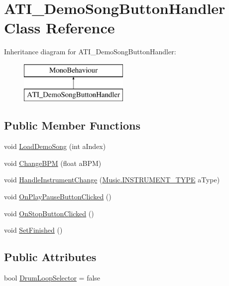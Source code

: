 \hypertarget{class_a_t_i___demo_song_button_handler}{}\section{A\+T\+I\+\_\+\+Demo\+Song\+Button\+Handler Class Reference}
\label{class_a_t_i___demo_song_button_handler}
Inheritance diagram for A\+T\+I\+\_\+\+Demo\+Song\+Button\+Handler\+:\begin{figure}[H]
\begin{center}
\leavevmode
\includegraphics[height=2.000000cm]{class_a_t_i___demo_song_button_handler}
\end{center}
\end{figure}
\subsection*{Public Member Functions}
\begin{DoxyCompactItemize}
\item 
void \hyperlink{class_a_t_i___demo_song_button_handler_a584b9dd672e492fe0df592061c7733de}{Load\+Demo\+Song} (int a\+Index)
\item 
void \hyperlink{class_a_t_i___demo_song_button_handler_a9a7fc268b3021a826dc4ad031a856dfc}{Change\+B\+PM} (float a\+B\+PM)
\item 
void \hyperlink{class_a_t_i___demo_song_button_handler_a2801913e33a297ae1f5db91f851ddea6}{Handle\+Instrument\+Change} (\hyperlink{group___music_enums_gabfce60192305965558a36e368ebd67c3}{Music.\+I\+N\+S\+T\+R\+U\+M\+E\+N\+T\+\_\+\+T\+Y\+PE} a\+Type)
\item 
void \hyperlink{class_a_t_i___demo_song_button_handler_a2b25debcc12ccdd2db23d4339d80f260}{On\+Play\+Pause\+Button\+Clicked} ()
\item 
void \hyperlink{class_a_t_i___demo_song_button_handler_a74b93fb6f260529a0f7260238226677b}{On\+Stop\+Button\+Clicked} ()
\item 
void \hyperlink{class_a_t_i___demo_song_button_handler_aec5406e1eb0c885f0e6fe044cfe4113e}{Set\+Finished} ()
\end{DoxyCompactItemize}
\subsection*{Public Attributes}
\begin{DoxyCompactItemize}
\item 
bool \hyperlink{class_a_t_i___demo_song_button_handler_a772b617c22a316a99f3a4b6979d0657a}{Drum\+Loop\+Selector} = false
\end{DoxyCompactItemize}
